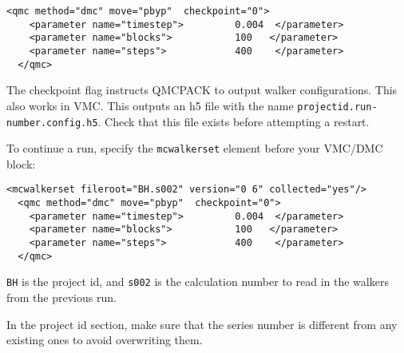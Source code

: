 \begin{itemize}
\begin{lstlisting}[style=QMCPXML,caption=The following is an example of running a simulation that can be restarted. ]
  <qmc method="dmc" move="pbyp"  checkpoint="0">
    <parameter name="timestep">         0.004  </parameter>
    <parameter name="blocks">           100   </parameter>
    <parameter name="steps">            400    </parameter>
  </qmc>
\end{lstlisting}

The checkpoint flag instructs QMCPACK to output walker configurations.  This also
works in VMC.  This outputs an h5 file with the name \texttt{projectid.run-number.config.h5}.
Check that this file exists before attempting a restart.

To continue a run, specify the \texttt{mcwalkerset} element before your VMC/DMC block:
\begin{lstlisting}[style=QMCPXML,caption=Restart (read walkers from previous run) ]
 <mcwalkerset fileroot="BH.s002" version="0 6" collected="yes"/>
  <qmc method="dmc" move="pbyp"  checkpoint="0">
    <parameter name="timestep">         0.004  </parameter>
    <parameter name="blocks">           100   </parameter>
    <parameter name="steps">            400    </parameter>
  </qmc>
\end{lstlisting}
\texttt{BH} is the project id, and \texttt{s002} is the calculation number to read in the walkers from the previous run.

In the project id section, make sure that the series number is different from any existing ones to avoid overwriting them. 

\end{itemize}
